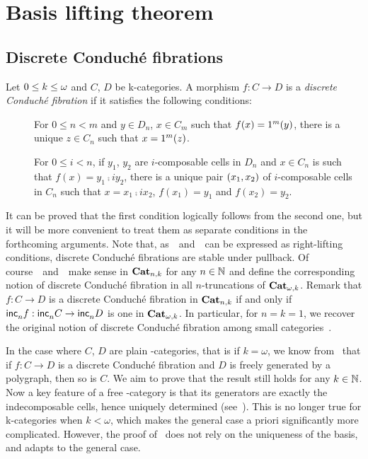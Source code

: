 \section{Basis lifting theorem}\label{sec:basislift}

\subsection{Discrete Conduché fibrations}\label{subsec:conduche}
\begin{definition}\label{def:conduche}
   Let $0 \leq k\leq \omega$ and $C$, $D$ be \ook k-categories. A morphism $f:C\to D$ is a {\em discrete Conduché fibration} if it satisfies the following conditions:
  \begin{description}
  \item[\cndi] For $0\leq n<m$ and  $y\in D_n$,  $x\in C_m$ such that $f(x)=1^{m}(y)$, there is a unique $z\in C_n$ such that $x=1^{m}(z)$.
    \item[\cndii] For $0\leq i<n$, if $y_1$, $y_2$ are $i$-composable cells in
      $D_n$ and $x\in C_n$ is such that $f(x)=y_1\comp i y_2$, there is a unique pair $(x_1,x_2)$ of $i$-composable cells in $C_n$ such that $x=x_1\comp i x_2$, $f(x_1)=y_1$ and $f(x_2)=y_2$.
    \end{description}
  \end{definition}
 \begin{paragr}\label{paragr:properties_conduche}
 It can be proved that the first condition logically
    follows from the second one, but it will be more convenient to treat
    them as separate conditions in the forthcoming arguments. Note that, as~\cndi\ 
    and~\cndii\ can be expressed as right-lifting conditions, 
    discrete Conduché fibrations are stable under pullback. Of
    course~\cndi\ and~\cndii\ make sense in $\mathbf{Cat}_{n,k}$ for any
    $n\in\mathbb N$ and define the corresponding notion of discrete Conduché
    fibration in all $n$-truncations of $\mathbf{Cat}_{\omega,k}$. 
    Remark that $f:C\to D$
    is a discrete Conduché fibration in $\mathbf{Cat}_{n,k}$ if and only if
    $\mathsf{inc}_{n}^{} f:\mathsf{inc}_{n}^{} C\to\mathsf{inc}_{n}^{} D$ is one in $\mathbf{Cat}_{\omega,k}$. In
    particular, for $n=k=1$, we recover the original notion of
    discrete Conduché fibration among small
    categories~\cite{conduche:exisad}.  
  \end{paragr}
  \begin{paragr} \label{paragr:lift_conduche}
In the case where $C$, $D$ are plain \oo-categories, that is if
$k=\omega$, we know from~\cite[Theorem 6.11]{guetta:poldcf} that if
$f:C\to D$ is a discrete Conduché fibration and $D$ is freely
generated by a polygraph, then so is $C$. We aim to prove that the
result still holds for any $k\in\mathbb N$. Now a key feature of a free \oo-category is that its generators are
     exactly the indecomposable cells, hence uniquely determined
     (see~\cite[Section 4, Proposition 8.3]{makkai:worcom}). This is
     no longer true for \ook k-categories when $k<\omega$, which makes the general case a
     priori significantly more complicated. However, the proof
     of~\cite[Theorem 6.11]{guetta:poldcf} does not rely on the
     uniqueness of the basis, and adapts to the general case.
  \end{paragr}
  
